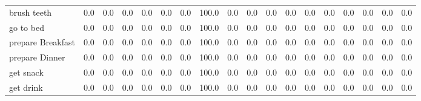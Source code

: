 \documentclass{article}
\begin{document}
\begin{sideways}
\begin{tabular}{lrrrrrrrrrrrrrrrrr}
brush teeth                   &         0.0 &                0.0 &           0.0 &               0.0 &                0.0 &                0.0 &            100.0 &                      0.0 &                   0.0 &              0.0 &              0.0 &                            0.0 &                      0.0 &                    0.0 &                                  0.0 &                          0.0 &                  0.0 \\
go to bed                     &         0.0 &                0.0 &           0.0 &               0.0 &                0.0 &                0.0 &            100.0 &                      0.0 &                   0.0 &              0.0 &              0.0 &                            0.0 &                      0.0 &                    0.0 &                                  0.0 &                          0.0 &                  0.0 \\
prepare Breakfast             &         0.0 &                0.0 &           0.0 &               0.0 &                0.0 &                0.0 &            100.0 &                      0.0 &                   0.0 &              0.0 &              0.0 &                            0.0 &                      0.0 &                    0.0 &                                  0.0 &                          0.0 &                  0.0 \\
prepare Dinner                &         0.0 &                0.0 &           0.0 &               0.0 &                0.0 &                0.0 &            100.0 &                      0.0 &                   0.0 &              0.0 &              0.0 &                            0.0 &                      0.0 &                    0.0 &                                  0.0 &                          0.0 &                  0.0 \\
get snack                     &         0.0 &                0.0 &           0.0 &               0.0 &                0.0 &                0.0 &            100.0 &                      0.0 &                   0.0 &              0.0 &              0.0 &                            0.0 &                      0.0 &                    0.0 &                                  0.0 &                          0.0 &                  0.0 \\
get drink                     &         0.0 &                0.0 &           0.0 &               0.0 &                0.0 &                0.0 &            100.0 &                      0.0 &                   0.0 &              0.0 &              0.0 &                            0.0 &                      0.0 &                    0.0 &                                  0.0 &                          0.0 &                  0.0 \\

\end{tabular}
\end{sideways}
\end{document}
